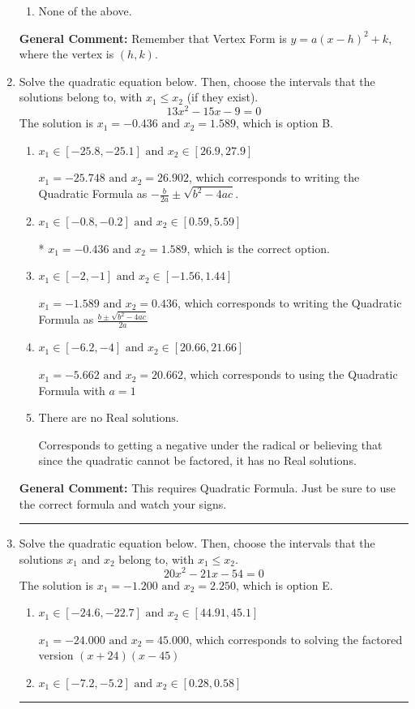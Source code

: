 \documentclass{extbook}[14pt]
\newcommand{\litem}[1]{\item #1

\rule{\textwidth}{0.4pt}}
\begin{document}
\begin{enumerate}
{\begin{enumerate}[label=\Alph*.]
\begin{multicols}{2}
\end{multicols}\item None of the above.\end{enumerate}
\textbf{General Comment:} Remember that Vertex Form is $y = a(x-h)^2+k$, where the vertex is $(h, k)$.
}
\litem{
Solve the quadratic equation below. Then, choose the intervals that the solutions belong to, with $x_1 \leq x_2$ (if they exist).
\[ 13x^{2} -15 x -9 = 0 \]The solution is \( x_1 = -0.436 \text{ and } x_2 = 1.589 \), which is option B.\begin{enumerate}[label=\Alph*.]
\item \( x_1 \in [-25.8, -25.1] \text{ and } x_2 \in [26.9, 27.9] \)

 $x_1 = -25.748 \text{ and } x_2 = 26.902$, which corresponds to writing the Quadratic Formula as $-\frac{b}{2a} \pm \sqrt{b^2 - 4ac}$.
\item \( x_1 \in [-0.8, -0.2] \text{ and } x_2 \in [0.59, 5.59] \)

* $x_1 = -0.436 \text{ and } x_2 = 1.589$, which is the correct option.
\item \( x_1 \in [-2, -1] \text{ and } x_2 \in [-1.56, 1.44] \)

 $x_1 = -1.589 \text{ and } x_2 = 0.436$, which corresponds to writing the Quadratic Formula as $\frac{b \pm \sqrt{b^2 - 4ac}}{2a}$
\item \( x_1 \in [-6.2, -4] \text{ and } x_2 \in [20.66, 21.66] \)

 $x_1 = -5.662 \text{ and } x_2 = 20.662$, which corresponds to using the Quadratic Formula with $a=1$
\item \( \text{There are no Real solutions.} \)

Corresponds to getting a negative under the radical or believing that since the quadratic cannot be factored, it has no Real solutions.
\end{enumerate}

\textbf{General Comment:} This requires Quadratic Formula. Just be sure to use the correct formula and watch your signs.
}
\litem{
Solve the quadratic equation below. Then, choose the intervals that the solutions $x_1$ and $x_2$ belong to, with $x_1 \leq x_2$.
\[ 20x^{2} -21 x -54 = 0 \]The solution is \( x_1 = -1.200 \text{ and } x_2 = 2.250 \), which is option E.\begin{enumerate}[label=\Alph*.]
\item \( x_1 \in [-24.6, -22.7] \text{ and } x_2 \in [44.91, 45.1] \)

$x_1 = -24.000 \text{ and } x_2 = 45.000$, which corresponds to solving the factored version $(x + 24)(x -45)$
\item \( x_1 \in [-7.2, -5.2] \text{ and } x_2 \in [0.28, 0.58] \)


\end{enumerate}}
\end{enumerate}
\end{document}
